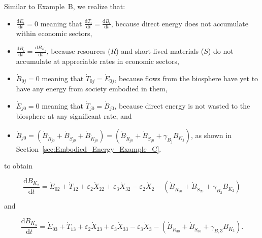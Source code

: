 \noindent{}Similar to Example~B, we realize that: 

\begin{itemize}
	\item{$\frac{\mathrm{d}E_i}{\mathrm{d}t} = 0$
		meaning that
		$\frac{\mathrm{d}T_i}{\mathrm{d}t} = \frac{\mathrm{d}B_i}{\mathrm{d}t}$, 
		because direct energy
		does not accumulate within economic sectors,}
	\item{$\frac{\mathrm{d}B_i}{\mathrm{d}t} = \frac{\mathrm{d}B_{K_{i}}}{\mathrm{d}t}$,
		because resources ($R$) and short-lived materials ($S$) do not 
		accumulate at appreciable rates in economic sectors,}
	\item{$\dot{B}_{0j} = 0$ meaning that $\dot{T}_{0j} = \dot{E}_{0j}$,
		because flows from the biosphere have yet to have any energy from society embodied in them,
		}
	\item{$\dot{E}_{j0} = 0$ meaning that $\dot{T}_{j0} = \dot{B}_{j0}$, 
	because direct energy is not wasted to the biosphere at any significant rate, and} 
	\item{$\dot{B}_{j0} = \left( \dot{B}_{\dot{R}_{j0}} 
							+ \dot{B}_{\dot{S}_{j0}}
							+ \dot{B}_{\dot{K}_{j0}}
							\right)
						= \left( \dot{B}_{\dot{R}_{j0}} 
							+ \dot{B}_{\dot{S}_{j0}}
							+ \gamma_{B_{j}} B_{K_{j}}
							\right)$, as shown in Section~\ref{sec:Embodied_Energy_Example_C}.}
\end{itemize}

\noindent{}to obtain

\begin{equation} \label{eq:C-Total_Energy_Sec_2-b}
	\frac{\mathrm{d}B_{K_{2}}}{\mathrm{d}t}
	= \dot{E}_{02}
	+ \dot{T}_{12}
	+ \varepsilon_{2} \dot{X}_{22}
	+ \varepsilon_{3} \dot{X}_{32}
	- \varepsilon_{2} \dot{X}_{2}
	- \left( \dot{B}_{\dot{R}_{20}} 
							+ \dot{B}_{\dot{S}_{20}}
							+ \gamma_{B_{2}} B_{K_{2}}
							\right)
\end{equation}

\noindent{}and

\begin{equation} \label{eq:C-Total_Energy_Sec_3-b}
	\frac{\mathrm{d}B_{K_{3}}}{\mathrm{d}t}
	= \dot{E}_{03}
	+ \dot{T}_{13}
	+ \varepsilon_{2} \dot{X}_{23}
	+ \varepsilon_{3} \dot{X}_{33}
	- \varepsilon_{3} \dot{X}_{3}
	- \left( \dot{B}_{\dot{R}_{30}} 
							+ \dot{B}_{\dot{S}_{30}}
							+ \gamma_{B,3} B_{K_{3}}
							\right).
\end{equation}


